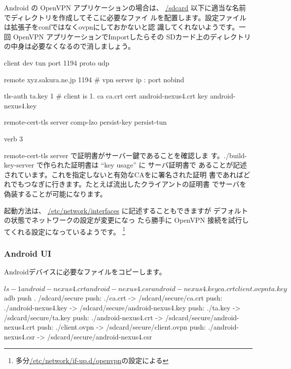 \documentclass[mingoth,a4paper]{jsarticle}
\begin{document}
Android の OpenVPN アプリケーションの場合\cite{openvpnconnectandroid}は、
\url{/sdcard} 以下に適当な名前でディレクトリを作成してそこに必要なファイ
ルを配置します。設定ファイルは拡張子をconfではなくovpnにしておかないと認
識してくれないようです。一回 OpenVPN アプリケーションでImportしたらその
SDカード上のディレクトリの中身は必要なくなるので消しましょう。

\begin{commandline}
client
dev tun
port 1194
proto udp

remote xyz.sakura.ne.jp 1194             # vpn server ip : port
nobind

tls-auth      ta.key 1 # client is 1.
ca ca.crt
cert android-nexus4.crt
key android-nexus4.key

remote-cert-tls server
comp-lzo
persist-key
persist-tun

verb 3

\end{commandline}

remote-cert-tls server で証明書がサーバー鍵であることを確認しま
す。./build-key-server で作られた証明書は ``key usage'' に サーバ証明書で
あることが記述されています。これを指定しないと有効なCAをに署名された証明
書であればどれでもつなぎに行きます。たとえば流出したクライアントの証明書
でサーバを偽装することが可能になります。

起動方法は、 \url{/etc/network/interfaces} に記述することもできますが
\cite{openvpnreadmedebian}デフォルトの状態でネットワークの設定が変更になっ
たら勝手に OpenVPN 接続を試行してくれる設定になっているようです。
\footnote{多分\url{/etc/network/if-up.d/openvpn}の設定による}

\subsubsection{Android UI}

Androidデバイスに必要なファイルをコピーします。
\begin{commandline}
$ ls -1
android-nexus4.crt
android-nexus4.csr
android-nexus4.key
ca.crt
client.ovpn
ta.key
$ adb push . /sdcard/secure
push: ./ca.crt -> /sdcard/secure/ca.crt
push: ./android-nexus4.key -> /sdcard/secure/android-nexus4.key
push: ./ta.key -> /sdcard/secure/ta.key
push: ./android-nexus4.crt -> /sdcard/secure/android-nexus4.crt
push: ./client.ovpn -> /sdcard/secure/client.ovpn
push: ./android-nexus4.csr -> /sdcard/secure/android-nexus4.csr
\end{commandline}
\end{document}
